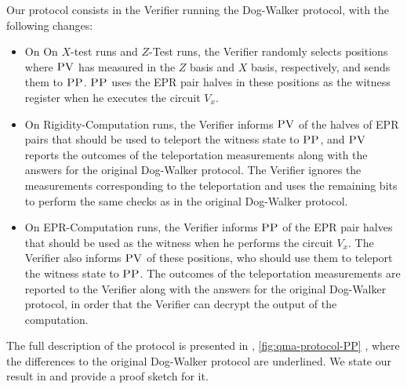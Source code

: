 \documentclass{toc}
\newcommand{\pv}{\textsc{PV}}
\newcommand{\pp}{\textsc{PP}}
\begin{document}
\newpage  %
Our protocol consists in the Verifier running the Dog-Walker protocol,
  with the following changes:
  \begin{itemize}
  \item On %
        On $X$-test runs 
        and $Z$-Test runs, %
the Verifier randomly selects  positions where
$\pv$ has measured in the $Z$ basis %
and $X$ basis, respectively, %
and sends them to $\pp$. $\pp$ uses the EPR pair halves in these positions as the witness register when he executes the circuit $V_x$.
    \item On Rigidity-Computation runs, the Verifier
      informs $\pv$ of the halves of EPR pairs that should be used to teleport the witness
      state to $\pp$, and $\pv$ reports the outcomes of the teleportation
      measurements along with the answers for the original Dog-Walker protocol. The Verifier ignores the measurements corresponding to the teleportation and uses the remaining bits to perform the same checks as in the original Dog-Walker protocol.
      \item On EPR-Computation runs, the Verifier informs $\pp$ of the
      EPR pair halves that should be used as the witness when he performs the circuit $V_x$.  
      The Verifier
      also informs $\pv$ of these positions, who should use them to teleport the witness
      state to $\pp$.  The outcomes of the teleportation      measurements are reported to the Verifier along with the answers for the original Dog-Walker protocol, in order that the Verifier can decrypt the output of the computation.
  \end{itemize}

The full description of the protocol is presented in , \ref{fig:qma-protocol-PP} , where the differences to the original Dog-Walker protocol are underlined. We state our result in  and provide a proof sketch for it. 
\end{document}
